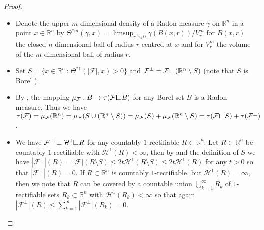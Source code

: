 \documentclass[10pt,a4paper,oneside,final]{article}
\newcommand{\R}{{\mathbb{R}}}
\newcommand{\hdone}{\mathcal{H}^1}
\newcommand{\restr}{{\mbox{\LARGE$\llcorner$}}}
\newcommand{\flux}{{\mathcal{F}}}
\numberwithin{equation}{section}
\theoremstyle{plain}
\theoremstyle{definition}
\theoremstyle{remark}
\newcommand{\notinclude}[1]{}
\begin{document}
\begin{proof}
\begin{itemize}
\item Denote the upper $m$-dimensional density of a Radon measure $\gamma$ on $\R^n$ in a point $x\in\R^n$ by $\Theta^{*m}(\gamma,x)=\limsup_{r\searrow0}\gamma(B(x,r))/V_r^m$
for $B(x,r)$ the closed $n$-dimensional ball of radius $r$ centred at $x$ and for $V_r^m$ the volume of the $m$-dimensional ball of radius $r$.
\item Set $S=\{x\in\R^n\,:\,\Theta^{*1}(|\flux|,x)>0\}$ and $\flux^\perp=\flux\restr(\R^n\setminus S)$ (note that $S$ is Borel \cite[Prop.\,(1.1)]{Ed94}\notinclude{http://math.stackexchange.com/questions/1884629/is-the-domain-of-the-symmetric-derivative-of-a-borel-measure-a-borel-set/1885155}).
\item By \cite[Thm.\,6.1(3)]{Wh99b}, the mapping $\mu_\flux:B\mapsto\tau(\flux\restr B)$ for any Borel set $B$ is a Radon measure.
Thus we have $\tau(\flux)=\mu_\flux(\R^n)=\mu_\flux(S\cup(\R^n\setminus S))=\mu_\flux(S)+\mu_\flux(\R^n\setminus S)=\tau(\flux\restr S)+\tau(\flux^\perp)$.
\item We have $\flux^\perp\perp\hdone\restr R$ for any countably $1$-rectifiable $R\subset\R^n$:
Let $R\subset\R^n$ be countably $1$-rectifiable with $\hdone(R)<\infty$, then by \cite[2.10.19]{Fe69} and the definition of $S$
\notinclude{easier to grasp: https://www.math.washington.edu/~morrow/334_15/geoMeasure.pdf p.294}%
we have $|\flux^\perp|(R)=|\flux|(R\setminus S)\leq2t\hdone(R\setminus S)\leq2t\hdone(R)$ for any $t>0$ so that $|\flux^\perp|(R)=0$.
If $R\subset\R^n$ is countably $1$-rectifiable, but $\hdone(R)=\infty$,
then we note that $R$ can be covered by a countable union $\bigcup_{k=1}^\infty R_k$ of $1$-rectifiable sets $R_k\subset\R^n$ with $\hdone(R_k)<\infty$
so that again $|\flux^\perp|(R)\leq\sum_{k=1}^\infty|\flux^\perp|(R_k)=0$.

\end{itemize}
\end{proof}
\end{document}
